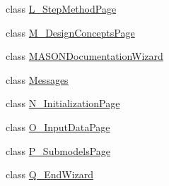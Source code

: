 \begin{DoxyCompactItemize}
\item 
class \hyperlink{classit_1_1isislab_1_1masonhelperdocumentation_1_1mason_1_1wizards_1_1_l___step_method_page}{L\-\_\-\-Step\-Method\-Page}
\item 
class \hyperlink{classit_1_1isislab_1_1masonhelperdocumentation_1_1mason_1_1wizards_1_1_m___design_concepts_page}{M\-\_\-\-Design\-Concepts\-Page}
\item 
class \hyperlink{classit_1_1isislab_1_1masonhelperdocumentation_1_1mason_1_1wizards_1_1_m_a_s_o_n_documentation_wizard}{M\-A\-S\-O\-N\-Documentation\-Wizard}
\item 
class \hyperlink{classit_1_1isislab_1_1masonhelperdocumentation_1_1mason_1_1wizards_1_1_messages}{Messages}
\item 
class \hyperlink{classit_1_1isislab_1_1masonhelperdocumentation_1_1mason_1_1wizards_1_1_n___initialization_page}{N\-\_\-\-Initialization\-Page}
\item 
class \hyperlink{classit_1_1isislab_1_1masonhelperdocumentation_1_1mason_1_1wizards_1_1_o___input_data_page}{O\-\_\-\-Input\-Data\-Page}
\item 
class \hyperlink{classit_1_1isislab_1_1masonhelperdocumentation_1_1mason_1_1wizards_1_1_p___submodels_page}{P\-\_\-\-Submodels\-Page}
\item 
class \hyperlink{classit_1_1isislab_1_1masonhelperdocumentation_1_1mason_1_1wizards_1_1_q___end_wizard}{Q\-\_\-\-End\-Wizard}
\end{DoxyCompactItemize}
